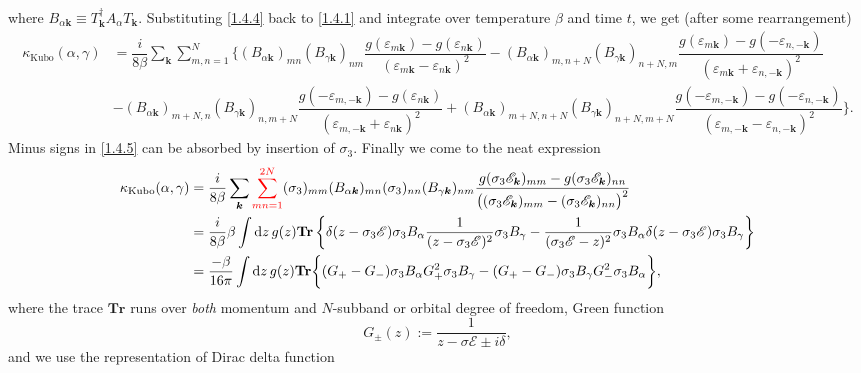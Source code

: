 \documentclass[10pt,nofootinbib]{revtex4}
\newcommand*\dd{\mathop{}\!\mathrm{d}}
\begin{document}
		where $B_{\alpha\bm{k}}\equiv T_{\bm{k}}^\dagger A_\alpha T_{\bm{k}}$. Substituting \eqref{1.4.4} back to \eqref{1.4.1} and integrate over temperature $\beta$ and time $t$, we get (after some rearrangement)
		\begin{align}
			\kappa_{\text{Kubo}}(\alpha,\gamma)&=\dfrac{i}{8\beta}\sum_{\bm{k}}\sum_{m,n=1}^N\bigg\{(B_{\alpha\bm{k}})_{mn}(B_{\gamma\bm{k}})_{nm}\dfrac{g(\varepsilon_{m\bm{k}})-g(\varepsilon_{n\bm{k}})}{(\varepsilon_{m\bm{k}}-\varepsilon_{n\bm{k}})^2}-(B_{\alpha\bm{k}})_{m,n+N}(B_{\gamma\bm{k}})_{n+N,m}\dfrac{g(\varepsilon_{m\bm{k}})-g(-\varepsilon_{n,-\bm{k}})}{(\varepsilon_{m\bm{k}}+\varepsilon_{n,-\bm{k}})^2}\nonumber\\
			&-(B_{\alpha\bm{k}})_{m+N,n}(B_{\gamma\bm{k}})_{n,m+N}\dfrac{g(-\varepsilon_{m,-\bm{k}})-g(\varepsilon_{n\bm{k}})}{(\varepsilon_{m,-\bm{k}}+\varepsilon_{n\bm{k}})^2}+(B_{\alpha\bm{k}})_{m+N,n+N}(B_{\gamma\bm{k}})_{n+N,m+N}\dfrac{g(-\varepsilon_{m,-\bm{k}})-g(-\varepsilon_{n,-\bm{k}})}{(\varepsilon_{m,-\bm{k}}-\varepsilon_{n,-\bm{k}})^2}\bigg\}.\label{1.4.5}
		\end{align}
		Minus signs in \eqref{1.4.5} can be absorbed by insertion of $\sigma_3$. Finally we come to the neat expression
		\begin{align}\label{1.4.6}
			\kappa_{\text{Kubo}}(\alpha,\gamma)&=\dfrac{i}{8\beta}\sum_{\bm{k}}{\color{red}\sum_{mn=1}^{2N}}(\sigma_3)_{mm}(B_{\alpha\bm{k}})_{mn}(\sigma_3)_{nn}(B_{\gamma\bm{k}})_{nm}\dfrac{g(\sigma_3\mathscr{E}_{\bm{k}})_{mm}-g(\sigma_3\mathscr{E}_{\bm{k}})_{nn}}{\big((\sigma_3\mathscr{E}_{\bm{k}})_{mm}-(\sigma_3\mathscr{E}_{\bm{k}})_{nn}\big)^2}\nonumber\\
			&=\dfrac{i}{8\beta}\beta\int\dd z\,g(z)\mathbf{Tr}\left\{\delta(z-\sigma_3\mathscr{E})\sigma_3 B_\alpha\dfrac{1}{(z-\sigma_3\mathscr{E})^2}\sigma_3 B_\gamma-\dfrac{1}{(\sigma_3\mathscr{E}-z)^2}\sigma_3 B_\alpha\delta(z-\sigma_3\mathscr{E})\sigma_3 B_\gamma\right\}\nonumber\\
			&=\dfrac{-\beta}{16\pi}\int\dd z\,g(z)\mathbf{Tr}\bigg\{(G_+-G_-)\sigma_3 B_\alpha G_+^2\sigma_3 B_\gamma-(G_+-G_-)\sigma_3 B_\gamma G_-^2\sigma_3 B_\alpha\bigg\},
		\end{align}
		where the trace $\mathbf{Tr}$ runs over \emph{both} momentum and $N$-subband or orbital degree of freedom, Green function
		\begin{equation*}
			G_{\pm}(z):=\dfrac{1}{z-\sigma\mathscr{E}\pm i\delta},
		\end{equation*}
		and we use the representation of Dirac delta function
\end{document}

